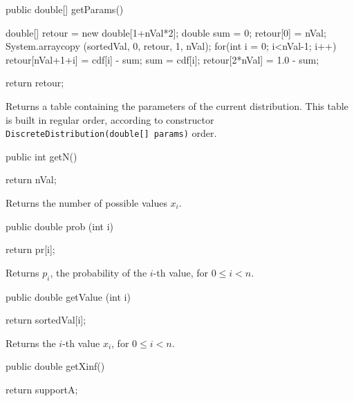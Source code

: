 \begin{code}

   public double[] getParams()\begin{hide} {
      double[] retour = new double[1+nVal*2];
      double sum = 0;
      retour[0] = nVal;
      System.arraycopy (sortedVal, 0, retour, 1, nVal);
      for(int i = 0; i<nVal-1; i++) {
         retour[nVal+1+i] = cdf[i] - sum;
         sum = cdf[i];
      }
      retour[2*nVal] = 1.0 - sum;

      return retour;
   }\end{hide}
\end{code}
\begin{tabb}
   Returns a table containing the parameters of the current distribution.
   This table is built in regular order, according to constructor
   \texttt{DiscreteDistribution(double[] params)} order.
\end{tabb}
\begin{code}

   public int getN()\begin{hide} {
      return nVal;
   }\end{hide}
\end{code}
\begin{tabb} Returns the number of possible values $x_i$.
\end{tabb}
\begin{code}

   public double prob (int i)\begin{hide} {
      return pr[i];
   }\end{hide}
\end{code}
\begin{tabb}  Returns $p_i$, the probability of
  the $i$-th value, for $0\le i<n$.
\end{tabb}
\begin{htmlonly}
\end{htmlonly}
\begin{code}

   public double getValue (int i)\begin{hide} {
      return sortedVal[i];
   }\end{hide}
\end{code}
\begin{tabb}
   Returns the $i$-th value $x_i$, for $0\le i<n$.
\end{tabb}
\begin{code}

   public double getXinf()\begin{hide} {
      return supportA;
   }\end{hide}
\end{code}
